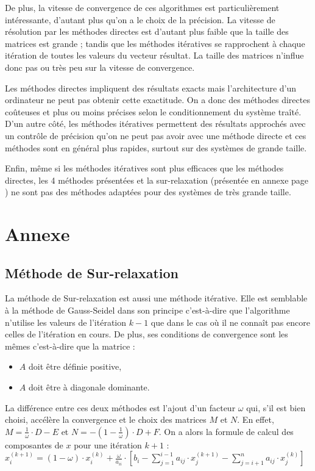 \documentclass{report}
\begin{document}
    De plus, la vitesse de convergence de ces algorithmes est particulièrement intéressante, d'autant plus qu'on a le choix de la précision. La vitesse de résolution par les méthodes directes est d'autant plus faible que la taille des matrices est grande ; tandis que les méthodes itératives se rapprochent à chaque itération de toutes les valeurs du vecteur résultat. La taille des matrices n'influe donc pas ou très peu sur la vitesse de convergence.

    \vspace{0.7cm}
    Les méthodes directes impliquent des résultats exacts mais l'architecture d'un ordinateur ne peut pas obtenir cette exactitude. On a donc des méthodes directes coûteuses et plus ou moins précises selon le conditionnement du système traîté. D'un autre côté, les méthodes itératives permettent des résultats approchés avec un contrôle de précision qu'on ne peut pas avoir avec une méthode directe et ces méthodes sont en général plus rapides, surtout sur des systèmes de grande taille.

    \vspace{0.7cm}
    Enfin, même si les méthodes itératives sont plus efficaces que les méthodes directes, les 4 méthodes présentées et la sur-relaxation (présentée en annexe page \pageref{surrelaxation}) ne sont pas des méthodes adaptées pour des systèmes de très grande taille.
    \newpage
  \chapter{Annexe}
    \section{Méthode de Sur-relaxation}
    La méthode de Sur-relaxation est aussi une méthode itérative. Elle est semblable à la méthode de Gauss-Seidel dans son principe c'est-à-dire que l'algorithme n'utilise les valeurs de l'itération $k-1$ que dans le cas où il ne connaît pas encore celles de l'itération en cours.
    \newline
    De plus, ses conditions de convergence sont les mêmes c'est-à-dire que la matrice :
          \begin{itemize}
        \item{$A$ doit être définie positive,}
        \item{$A$ doit être à diagonale dominante.}
      \end{itemize}
    La différence entre ces deux méthodes est l'ajout d'un facteur $ \omega $ qui, s'il est bien choisi, accélère la convergence et le choix des matrices $M$ et $N$. 
    \newline
    En effet, $M = \frac{1}{\omega} \cdot D - E$ et $N = - \left( 1- \frac{1}{\omega} \right) \cdot D + F $.
    \newline
    On a alors la formule de calcul des composantes de $x$ pour une itération $k+1$ :
    \newline
    $x_{i}^{(k+1)} = (1 - \omega) \cdot x_{i}^{(k)} +  \frac{\omega}{a_{ii}} \cdot \left [ b_{i} - \sum_{j=1}^{i-1} a_{ij} \cdot x_{j}^{(k+1)} - \sum_{j=i+1}^{n} a_{ij} \cdot x_{j}^{(k)} \right ] $
      \newline
\end{document}
